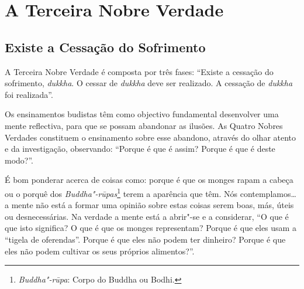 
\chapter{A Terceira Nobre Verdade}

\pagestyle{topbottomcorner}

\section{Existe a Cessação do Sofrimento}

A Terceira Nobre Verdade é composta por três fases: “Existe a cessação do
sofrimento, \emph{dukkha}. O cessar de \emph{dukkha} deve ser realizado. A
cessação de \emph{dukkha} foi realizada”.

Os ensinamentos budistas têm como objectivo fundamental desenvolver uma mente
reflectiva, para que se possam abandonar as ilusões. As Quatro Nobres Verdades
constituem o ensinamento sobre esse abandono, através do olhar atento e da
investigação, observando: “Porque é que é assim? Porque é que é deste modo?”.

É bom ponderar acerca de coisas como: porque é que os monges rapam a cabeça ou o
porquê dos \emph{Buddha"-rūpas}\footnote{%
  \emph{Buddha"-rūpa}: Corpo do Buddha ou Bodhi.} terem a aparência que têm. Nós
contemplamos\ldots{} a mente não está a formar uma opinião sobre estas coisas
serem boas, más, úteis ou desnecessárias. Na verdade a mente está a abrir"-se e a
considerar, “O que é que isto significa? O que é que os monges representam?
Porque é que eles usam a “tigela de oferendas”. Porque é que eles não podem ter
dinheiro? Porque é que eles não podem cultivar os seus próprios alimentos?”.

